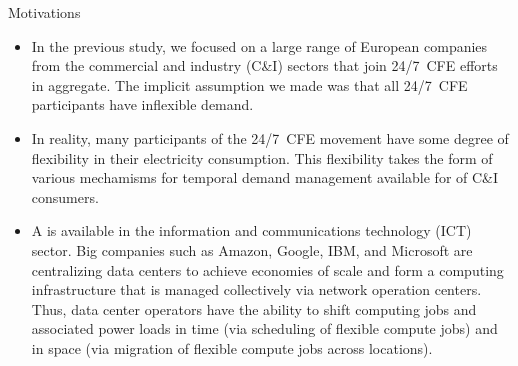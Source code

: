 \begin{frame}{Motivations}

  {\footnotesize
  \begin{itemize}
  \item In the previous study, we focused on a large range of European companies from the commercial and industry (C\&I) sectors that join 24/7~CFE efforts in aggregate. The implicit assumption we made was that all 24/7~CFE participants have \alert{inflexible demand}.
  
  \item In reality, many participants of the 24/7~CFE movement have some degree of flexibility in their electricity consumption. This flexibility takes the form of various mechamisms for temporal demand management available for  of C\&I consumers.

  \item  A  is available in the information and communications technology (ICT) sector. Big companies such as Amazon, Google, IBM, and Microsoft are centralizing data centers to achieve economies of scale and form a computing infrastructure that is managed collectively via network operation centers. Thus, data center operators have the ability to \alert{shift computing jobs and associated power loads} in time (via scheduling of flexible compute jobs) and in space (via migration of flexible compute jobs across locations). 
  \end{itemize}

  }

\end{frame}
  

